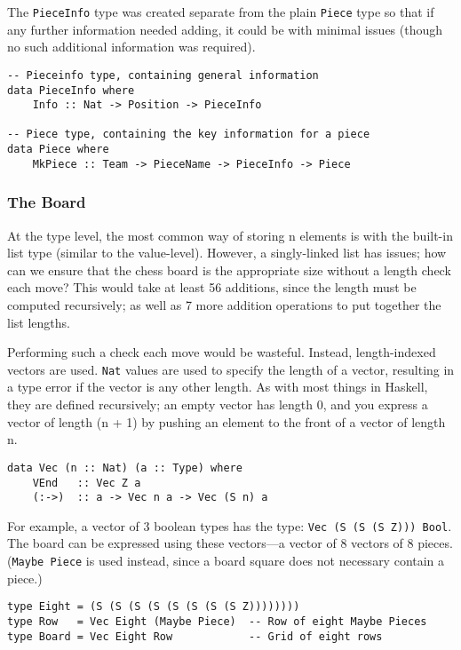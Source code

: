 \documentclass[12pt, a4paper]{scrartcl}
\begin{document}
The \lstinline{PieceInfo} type was created separate from the plain \lstinline{Piece} type so that if any further information needed adding, it could be with minimal issues (though no such additional information was required).

\begin{lstlisting}
-- Pieceinfo type, containing general information
data PieceInfo where
    Info :: Nat -> Position -> PieceInfo

-- Piece type, containing the key information for a piece
data Piece where
    MkPiece :: Team -> PieceName -> PieceInfo -> Piece
\end{lstlisting}

\subsubsection{The Board}

At the type level, the most common way of storing n elements is with the built-in list type (similar to the value-level). However, a singly-linked list has issues; how can we ensure that the chess board is the appropriate size without a length check each move? This would take at least 56 additions, since the length must be computed recursively; as well as 7 more addition operations to put together the list lengths.

Performing such a check each move would be wasteful. Instead, length-indexed vectors are used. \lstinline{Nat} values are used to specify the length of a vector, resulting in a type error if the vector is any other length. As with most things in Haskell, they are defined recursively; an empty vector has length 0, and you express a vector of length (n + 1) by pushing an element to the front of a vector of length n.

\begin{lstlisting}
data Vec (n :: Nat) (a :: Type) where
    VEnd   :: Vec Z a
    (:->)  :: a -> Vec n a -> Vec (S n) a
\end{lstlisting}

For example, a vector of 3 boolean types has the type: \lstinline{Vec (S (S (S Z))) Bool}. The board can be expressed using these vectors---a vector of 8 vectors of 8 pieces. (\lstinline{Maybe Piece} is used instead, since a board square does not necessary contain a piece.)

\begin{lstlisting}
type Eight = (S (S (S (S (S (S (S (S Z))))))))
type Row   = Vec Eight (Maybe Piece)  -- Row of eight Maybe Pieces
type Board = Vec Eight Row            -- Grid of eight rows
\end{lstlisting}
\end{document}
